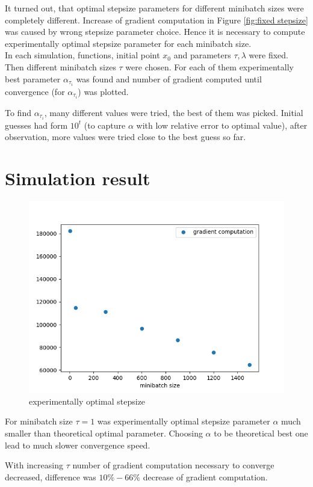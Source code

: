 \documentclass[11pt]{book}
\begin{document}
It turned out, that optimal stepsize parameters for different minibatch sizes were completely different. Increase of gradient computation in Figure \ref{fig:fixed stepsize} was caused by wrong stepsize parameter choice. Hence it is necessary to compute experimentally optimal stepsize parameter for each minibatch size.\\


In each simulation, functions, initial point $x_0$ and parameters $\tau, \lambda$ were fixed. Then different minibatch sizes $\tau$ were chosen. For each of them experimentally best parameter $\alpha_{\tau_i}$ was found and number of gradient computed until convergence (for $\alpha_{\tau_i}$) was plotted. 

To find $\alpha_{\tau_i}$, many different values were tried, the best of them was picked. Initial guesses had form $10^t$ (to capture $\alpha$ with low relative error to optimal value), after observation, more values were tried close to the best guess so far.\\

\section{Simulation result}

\begin{figure}[H]
	\centering
	\includegraphics[width=.7\linewidth]{optimal_stepsize.png}
	\caption{experimentally optimal stepsize}
	\label{fig:optimal stepsize}
\end{figure}



For minibatch size $\tau=1$ was experimentally optimal stepsize parameter $\alpha$ much smaller than theoretical optimal parameter. Choosing $\alpha$ to be theoretical best one lead to much slower convergence speed.

With increasing $\tau$ number of gradient computation necessary to converge decreased, difference was $10\% - 66\%$ decrease of gradient computation.
\end{document}
